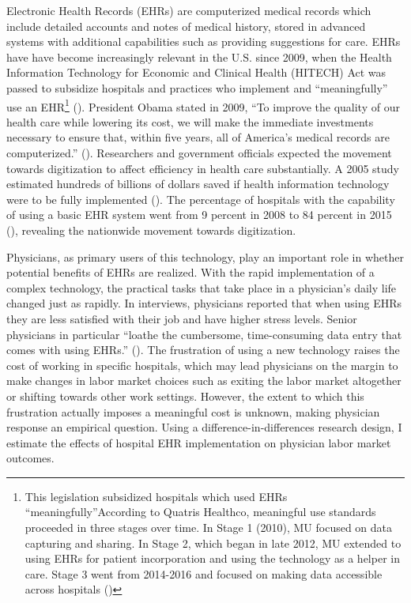 \documentclass[11pt]{article}
\begin{document}
Electronic Health Records (EHRs) are computerized medical records which include detailed accounts and notes of medical history, stored in advanced systems with additional capabilities such as providing suggestions for care. EHRs have have become increasingly relevant in the U.S. since 2009, when the Health Information Technology for Economic and Clinical Health (HITECH) Act was passed to subsidize hospitals and practices who implement and ``meaningfully'' use an EHR\footnote{This legislation subsidized hospitals which used EHRs “meaningfully”According to Quatris Healthco, meaningful use standards proceeded in three stages over time. In Stage 1 (2010), MU focused on data capturing and sharing. In Stage 2, which began in late 2012, MU extended to using EHRs for patient incorporation and using the technology as a helper in care. Stage 3 went from 2014-2016 and focused on making data accessible across hospitals (\cite{meanuse})} (\cite{hitech}). President Obama stated in 2009, “To improve the quality of our health care while lowering its cost, we will make the immediate investments necessary to ensure that, within five years, all of America’s medical records are computerized.” (\cite{presquote}). Researchers and government officials expected the movement towards digitization to affect efficiency in health care substantially. A 2005 study estimated hundreds of billions of dollars saved if health information technology were to be fully implemented (\cite{hillestad2005}). The percentage of hospitals with the capability of using a basic EHR system went from 9 percent in 2008 to 84 percent in 2015 (\cite{stats}), revealing the nationwide movement towards digitization.

Physicians, as primary users of this technology, play an important role in whether potential benefits of EHRs are realized. With the rapid implementation of a complex technology, the practical tasks that take place in a physician's daily life changed just as rapidly. In interviews, physicians reported that when using EHRs they are less satisfied with their job and have higher stress levels. Senior physicians in particular “loathe the cumbersome, time-consuming data entry that comes with using EHRs.” (\cite{CollierBurnout}). The frustration of using a new technology raises the cost of working in specific hospitals, which may lead physicians on the margin to make changes in labor market choices such as exiting the labor market altogether or shifting towards other work settings. However, the extent to which this frustration actually imposes a meaningful cost is unknown, making physician response an empirical question. Using a difference-in-differences research design, I estimate the effects of hospital EHR implementation on physician labor market outcomes.
\end{document}
